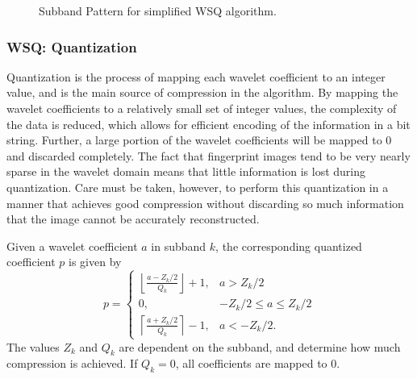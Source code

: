 \begin{figure}
\begin{center}

\caption{Subband Pattern for simplified WSQ algorithm.}
\label{fig:subbands}
\end{center}
\end{figure}

\subsubsection*{WSQ: Quantization}
Quantization is the process of mapping each wavelet coefficient to an integer value, and is the main source of compression in the algorithm.
By mapping the wavelet coefficients to a relatively small set of integer values, the complexity of the data is reduced, which allows for efficient encoding of the information in a bit string.
Further, a large portion of the wavelet coefficients will be mapped to 0 and discarded completely.
The fact that fingerprint images tend to be very nearly sparse in the wavelet domain means that little information is lost during quantization.
Care must be taken, however, to perform this quantization in a manner that achieves good compression without discarding so much information that the image cannot be accurately reconstructed.

Given a wavelet coefficient $a$ in subband $k$, the corresponding quantized coefficient $p$ is given by
\[
p =
\begin{cases}
   \left\lfloor\frac{a-Z_k/2}{Q_k}\right\rfloor + 1, & a> Z_k/2 \\
   0,       & -Z_k/2 \leq a \leq Z_k/2\\
   \left\lceil\frac{a + Z_k/2}{Q_k}\right\rceil - 1, & a < -Z_k/2.
  \end{cases}
\]
The values $Z_k$ and $Q_k$ are dependent on the subband, and determine how much compression is achieved.
If $Q_k=0$, all coefficients are mapped to 0.

